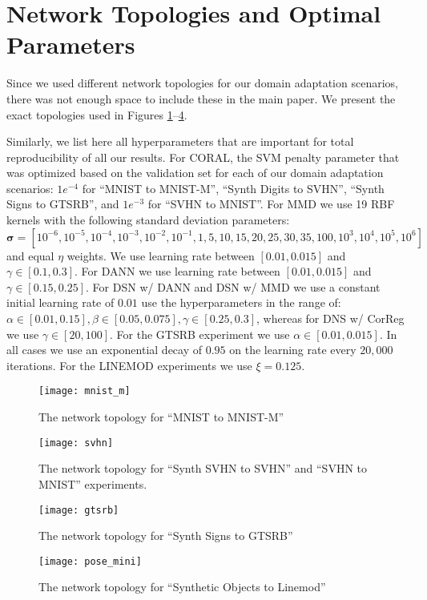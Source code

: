 \documentclass{article}
\newcommand{\bs}[1]{\boldsymbol{\mathbf{#1}}}
\begin{document}
\section{Network Topologies and Optimal Parameters}
Since we used different network topologies for our domain adaptation scenarios, there was not enough space to include these in the main paper. We present the exact topologies used in Figures \ref{fig:mnist_arch}--\ref{fig:mnist_arch4}. 

Similarly, we list here all hyperparameters that are important for total reproducibility of all our results.
For CORAL, the SVM
penalty parameter that was optimized based on the validation set for each of our domain adaptation scenarios: $1e^{-4}$ for ``MNIST to MNIST-M'', ``Synth Digits to SVHN'', ``Synth Signs to GTSRB'', and  $1e^{-3}$ for ``SVHN to MNIST''.
For MMD we use 19 RBF kernels with the following standard deviation parameters:
\begin{equation*}
    \bs \sigma = [10^{-6}, 10^{-5}, 10^{-4}, 10^{-3}, 10^{-2}, 10^{-1}, 1, 5, 10, 15, 20, 25, 30, 35, 100, 10^{3}, 10^{4}, 10^{5}, 10^{6}]
\end{equation*}
and equal $\eta$ weights. We use learning rate between $[0.01, 0.015]$ and $\gamma \in [0.1, 0.3]$. 
For DANN we use learning rate between $[0.01, 0.015]$ and $\gamma \in [0.15, 0.25]$.
For DSN w/ DANN and DSN w/ MMD we use a constant initial learning rate of $0.01$  use the hyperparameters in the range of: $\alpha \in [0.01, 0.15], \beta \in [0.05, 0.075], \gamma \in [0.25, 0.3]$, whereas for DNS w/ CorReg we use $\gamma \in [20, 100]$. For the GTSRB experiment we use $\alpha \in [0.01, 0.015]$. In all cases we use an exponential decay of $0.95$ on the learning rate every $20,000$ iterations. For the LINEMOD experiments we use $\xi = 0.125$.




\begin{figure}
    \centering
    \texttt{[image: mnist\_m]}
    \caption{The network topology for ``MNIST to MNIST-M''}
    \label{fig:mnist_arch}
\end{figure}

\begin{figure}
    \centering
    \texttt{[image: svhn]}
    \caption{The network topology for ``Synth SVHN to SVHN'' and ``SVHN to MNIST'' experiments.}
    \label{fig:mnist_arch2}
\end{figure}

\begin{figure}
    \centering
    \texttt{[image: gtsrb]}
    \caption{The network topology for ``Synth Signs to GTSRB''}
    \label{fig:mnist_arch3}
\end{figure}


\begin{figure}
    \centering
    \texttt{[image: pose\_mini]}
    \caption{The network topology for ``Synthetic Objects to Linemod''}
    \label{fig:mnist_arch4}
\end{figure}

\clearpage



 
\end{document}
